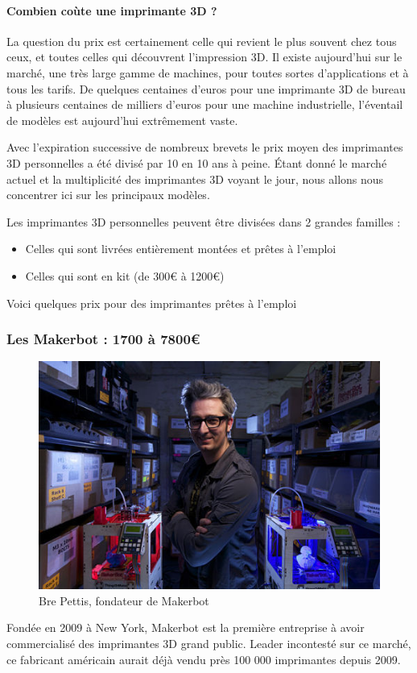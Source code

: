 \documentclass{article}
\begin{document}
\paragraph{Combien coùte une imprimante 3D ?} \hfill 
 \par\leavevmode\par
La question du prix est certainement celle qui revient le plus souvent chez tous ceux, et toutes celles  qui découvrent l'impression 3D. Il existe aujourd'hui sur le marché, une très large gamme de machines, pour toutes sortes d'applications et à tous les tarifs. De quelques centaines d'euros pour une imprimante 3D de bureau à plusieurs centaines de milliers d'euros pour une machine industrielle, l'éventail de modèles est aujourd'hui extrêmement vaste.\hfill
 \par\leavevmode\par
Avec l'expiration successive de nombreux brevets le prix moyen des imprimantes 3D personnelles a été divisé par 10 en 10 ans à peine. Étant donné le marché actuel et la multiplicité des imprimantes 3D voyant le jour, nous allons nous concentrer ici sur les principaux modèles.\hfill
 \par\leavevmode\par
Les imprimantes 3D personnelles peuvent être divisées dans 2 grandes familles :
\begin{itemize}
\item Celles qui sont livrées entièrement montées et prêtes à l'emploi
\item Celles qui sont en kit (de 300\euro{} à 1200\euro{})
\end{itemize}\hfill
 \par\leavevmode\par
Voici quelques prix pour des imprimantes prêtes à l'emploi

\subsubsection{Les Makerbot : 1700 à 7800\euro{}}
\begin{figure}[h!]
\centering
\includegraphics[scale=0.4]{./images/makerbot.png}
\caption{Bre Pettis, fondateur de Makerbot}
\end{figure}\hfill \break
Fondée en 2009 à New York, Makerbot est la première entreprise à avoir commercialisé des imprimantes 3D grand public. Leader incontesté sur ce marché, ce fabricant américain aurait déjà vendu près 100 000 imprimantes depuis 2009.
\newpage
\end{document}
